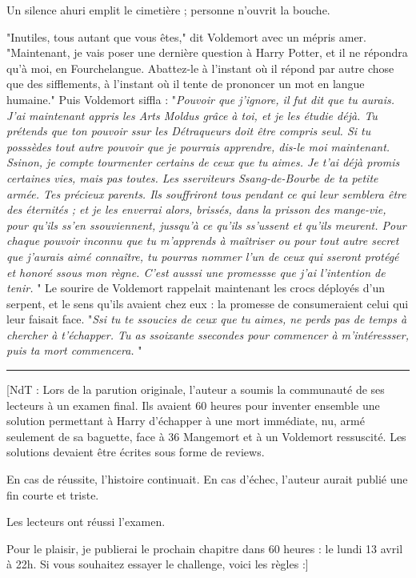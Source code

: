 Un silence ahuri emplit le cimetière ; personne n'ouvrit la bouche.

"Inutiles, tous autant que vous êtes," dit Voldemort avec un mépris amer. "Maintenant, je vais poser une dernière question à Harry Potter, et il ne répondra qu'à moi, en Fourchelangue. Abattez-le à l'instant où il répond par autre chose que des sifflements, à l'instant où il tente de prononcer un mot en langue humaine." Puis Voldemort siffla : "\emph{Pouvoir que j'ignore, il fut dit que tu aurais. J'ai maintenant appris les Arts Moldus grâce à toi, et je les étudie déjà. Tu prétends que ton pouvoir ssur les Détraqueurs doit être compris seul. Si tu posssèdes tout autre pouvoir que je pourrais apprendre, dis-le moi maintenant. Ssinon, je compte tourmenter certains de ceux que tu aimes. Je t'ai déjà promis certaines vies, mais pas toutes. Les sserviteurs Ssang-de-Bourbe de ta petite armée. Tes précieux parents. Ils souffriront tous pendant ce qui leur semblera être des éternités ; et je les enverrai alors, brissés, dans la prisson des mange-vie, pour qu'ils ss'en ssouviennent, jussqu'à ce qu'ils ss'ussent et qu'ils meurent. Pour chaque pouvoir inconnu que tu m'apprends à maîtriser ou pour tout autre secret que j'aurais aimé connaître, tu pourras nommer l'un de ceux qui sseront protégé et honoré ssous mon règne. C'est ausssi une promessse que j'ai l'intention de tenir.} " Le sourire de Voldemort rappelait maintenant les crocs déployés d'un serpent, et le sens qu'ils avaient chez eux : la promesse de consumeraient celui qui leur faisait face. "\emph{Ssi tu te ssoucies de ceux que tu aimes, ne perds pas de temps à chercher à t'échapper. Tu as ssoixante ssecondes pour commencer à m'intéressser, puis ta mort commencera.} "
\par\noindent\rule{\textwidth}{0.4pt}
[NdT : Lors de la parution originale, l'auteur a soumis la communauté de ses lecteurs à un examen final. Ils avaient 60 heures pour inventer ensemble une solution permettant à Harry d'échapper à une mort immédiate, nu, armé seulement de sa baguette, face à 36 Mangemort et à un Voldemort ressuscité. Les solutions devaient être écrites sous forme de reviews.

En cas de réussite, l'histoire continuait. En cas d'échec, l'auteur aurait publié une fin courte et triste.

Les lecteurs ont réussi l'examen.

Pour le plaisir, je publierai le prochain chapitre dans 60 heures : le lundi 13 avril à 22h. Si vous souhaitez essayer le challenge, voici les règles :]


